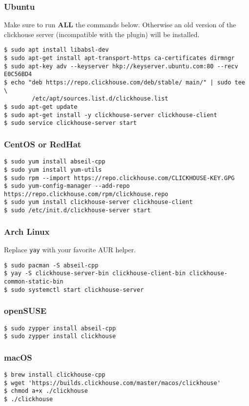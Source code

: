 \documentclass[documentation]{subfiles}
\begin{document}
\subsubsection{Ubuntu}
Make sure to run {\bf ALL} the commands below. Otherwise an old version of the clickhouse server (incompatible with the plugin) will be installed.
\begin{verbatim}
$ sudo apt install libabsl-dev
$ sudo apt-get install apt-transport-https ca-certificates dirmngr
$ sudo apt-key adv --keyserver hkp://keyserver.ubuntu.com:80 --recv E0C56BD4
$ echo "deb https://repo.clickhouse.com/deb/stable/ main/" | sudo tee \
        /etc/apt/sources.list.d/clickhouse.list
$ sudo apt-get update
$ sudo apt-get install -y clickhouse-server clickhouse-client
$ sudo service clickhouse-server start
\end{verbatim}

\subsubsection{CentOS or RedHat}
\begin{verbatim}
$ sudo yum install abseil-cpp
$ sudo yum install yum-utils
$ sudo rpm --import https://repo.clickhouse.com/CLICKHOUSE-KEY.GPG
$ sudo yum-config-manager --add-repo https://repo.clickhouse.com/rpm/clickhouse.repo
$ sudo yum install clickhouse-server clickhouse-client
$ sudo /etc/init.d/clickhouse-server start
\end{verbatim}

\subsubsection{Arch Linux}
Replace {\tt yay} with your favorite AUR helper.
\begin{verbatim}
$ sudo pacman -S abseil-cpp
$ yay -S clickhouse-server-bin clickhouse-client-bin clickhouse-common-static-bin
$ sudo systemctl start clickhouse-server
\end{verbatim}

\subsubsection{openSUSE}
\begin{verbatim}
$ sudo zypper install abseil-cpp
$ sudo zypper install clickhouse
\end{verbatim}

\subsubsection{macOS}
\begin{verbatim}
$ brew install clickhouse-cpp
$ wget 'https://builds.clickhouse.com/master/macos/clickhouse'
$ chmod a+x ./clickhouse
$ ./clickhouse
\end{verbatim}
\end{document}
